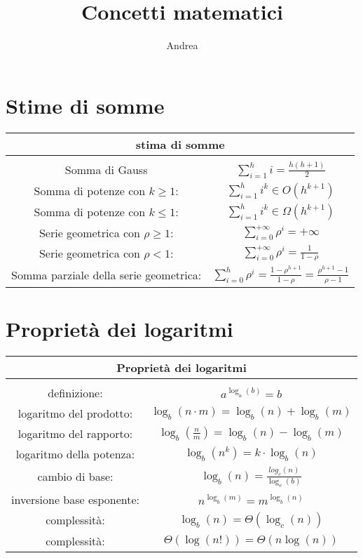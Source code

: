 \documentclass{article}
\title{Concetti matematici}
\author{Andrea}
\begin{document}
\section{Stime di somme}

\begin{tabular}{|cc|}
    \hline
    \multicolumn{2}{|c|}{stima di somme}\\
    \hline
    & \\
    Somma di Gauss & $\displaystyle \sum_{i=1}^{h} i = \frac{h(h+1)}{2}$ \\[0.6cm]
    Somma di potenze con $k \geq 1$: & $\displaystyle \sum_{i=1}^{h} i^k \in O(h^{k+1})$ \\[0.6cm]
    Somma di potenze con $k \leq 1$: & $ \displaystyle \sum_{i=1}^{h} i^k \in \Omega(h^{k+1})$\\[0.6cm]
    Serie geometrica con $\rho \geq 1$: & $\displaystyle \sum_{i=0}^{+ \infty} \rho^i = + \infty$ \\[0.6cm]
    Serie geometrica con $\rho < 1$: & $\displaystyle \sum_{i=0}^{+ \infty} \rho^i = \frac{1}{1-\rho}$ \\[0.6cm]
    Somma parziale della serie geometrica: & $\displaystyle \sum_{i=0}^{h} \rho^i = \frac{1-\rho^{h+1}}{1-\rho} = \frac{\rho^{h+1}-1}{\rho-1}$ \\[0.6cm]
    \hline
\end{tabular}


\section{Proprietà dei logaritmi}

\begin{tabular}{|cc|}
    \hline
    \multicolumn{2}{|c|}{Proprietà dei logaritmi} \\
    \hline
    & \\
    definizione: & $ a^{\log_a(b)} = b $ \\[0.4cm]
    logaritmo del prodotto: & $\log_b(n \cdot m) = \log_b(n) + \log_b(m)$ \\[0.4cm]
    logaritmo del rapporto: & $ \displaystyle \log_b(\frac{n}{m}) = \log_b(n) - \log_b(m)$ \\[0.4cm]
    logaritmo della potenza: & $\displaystyle \log_b(n^k) = k \cdot \log_b(n)$\\[0.4cm]
    cambio di base: & $\displaystyle \log_b(n) = \frac{log_c(n)}{\log_c(b)}$ \\[0.6cm]
    inversione base esponente: & $\displaystyle n^{\log_b(m)} = m^{\log_b(n)}$ \\[0.4cm]
    complessità: & $\displaystyle \log_b(n) = \Theta(\log_c(n))$ \\[0.4cm]
    complessità: & $\displaystyle \Theta(\log(n!)) = \Theta(n \log(n))$ \\[0.4cm]
    \hline
\end{tabular}
\end{document}
